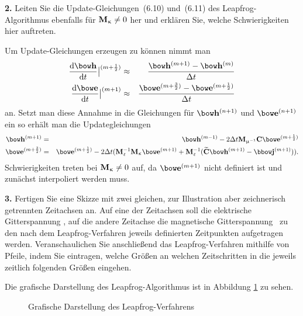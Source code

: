\documentclass[Protokollheft.tex]{subfiles}
\begin{document}
\begin{framed}
	\noindent \textbf{2.} Leiten Sie die Update-Gleichungen~(6.10) und~(6.11) des Leapfrog-Algorithmus ebenfalls für ${\mathbf{M}_{\upkappa} \neq 0}$ her und erklären Sie, welche Schwierigkeiten hier auftreten.\label{exer:updateSchemeWithConductor}
\end{framed}
\noindent
Um Update-Gleichungen erzeugen zu können nimmt man
\begin{eqnarray}
	\frac{\text{d}\hfit}{\text{d}t}\big |^{(m+\frac{1}{2})}&\approx&	\frac{\hfit^{(m+1)}-\hfit^{(m)}}{\Delta t}\\
	\frac{\text{d}\efit}{\text{d}t}\big |^{(m+1)}&\approx&	\frac{\efit^{(m+\frac{3}{2})}-\efit^{(m+\frac{1}{2})}}{\Delta t}	
\end{eqnarray}
an. Setzt man diese Annahme in die Gleichungen für $\hfit^{(n+1)}$ und $\efit^{(n+1)}$ ein so erhält man die Updategleichungen
\begin{eqnarray*}
	\hfit^{(m+1)}&=&\hfit^{(m-1)}-2\Delta t\Mmui\curlfit\efit^{(m+\frac{1}{2})}\\
	\efit^{(m+\frac{3}{2})}&=&\efit^{(m+\frac{1}{2})}-2\Delta t(\Meps^{-1}\Mkap\efit^{(m+1)}+\Meps^{-1}(\curldfit\hfit^{(m+1)}-\jfit^{(m+1)})).
\end{eqnarray*}
Schwierigkeiten treten bei ${\mathbf{M}_{\upkappa} \neq 0}$ auf, da $\efit^{(m+1)}$ nicht definiert ist und zunächst interpoliert werden muss. 
\begin{framed}
	\noindent \textbf{3.} Fertigen Sie eine Skizze mit zwei gleichen, zur Illustration aber zeichnerisch getrennten Zeitachsen an. Auf eine der Zeitachsen soll die elektrische Gitterspannung \efit, auf die andere Zeitachse die magnetische Gitterspannung \hfit\ zu den nach dem Leapfrog-Verfahren jeweils definierten Zeitpunkten aufgetragen werden. Veranschaulichen Sie anschließend das Leapfrog-Verfahren mithilfe von Pfeile, indem Sie eintragen, welche Größen an welchen Zeitschritten in die jeweils zeitlich folgenden Größen eingehen.\label{exer:LeapfrogOnTimeAxes}
\end{framed}
\noindent
Die grafische Darstellung des Leapfrog-Algorithmus ist in Abbildung \ref{fig:zeitachse} zu sehen.
\begin{figure}[h]
	\centering
	\def\svgwidth{0.7\textwidth}
	
	\caption{Grafische Darstellung des Leapfrog-Verfahrens}
	\label{fig:zeitachse}
\end{figure}
\end{document}
